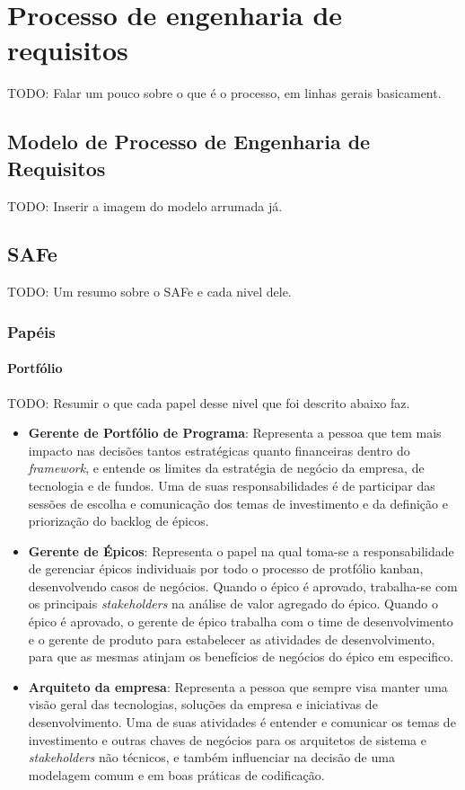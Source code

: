 \chapter{Processo de engenharia de requisitos}

TODO: Falar um pouco sobre o que é o processo, em linhas gerais basicament.

\section{Modelo de Processo de Engenharia de Requisitos}
  
  TODO: Inserir a imagem do modelo arrumada já.

\section{SAFe}
  
  TODO: Um resumo sobre o SAFe e cada nivel dele.

\subsection{Papéis}

\subsubsection{Portfólio}

  TODO: Resumir o que cada papel desse nivel que foi descrito abaixo faz.

  \begin{itemize}
    \item \textbf{Gerente de Portfólio de Programa}: Representa a pessoa que tem mais impacto nas decisões tantos estratégicas quanto financeiras dentro do \textit{framework}, e entende os limites da estratégia de negócio da empresa, de tecnologia e de fundos. Uma de suas responsabilidades é de participar das sessões de escolha e comunicação dos temas de investimento e da definição e priorização do backlog de épicos.
    \item \textbf{Gerente de Épicos}: Representa o papel na qual toma-se a responsabilidade de gerenciar épicos individuais por todo o processo de protfólio kanban, desenvolvendo casos de negócios. Quando o épico é aprovado, trabalha-se com os principais \textit{stakeholders} na análise de valor agregado do épico. Quando o épico é aprovado, o gerente de épico trabalha com o time de desenvolvimento e o gerente de produto para estabelecer as atividades de desenvolvimento, para que as mesmas atinjam os benefícios de negócios do épico em especifico.
    \item \textbf{Arquiteto da empresa}: Representa a pessoa que sempre visa manter uma visão geral das tecnologias, soluções da empresa e iniciativas de desenvolvimento. Uma de suas atividades é entender e comunicar os temas de investimento e outras chaves de negócios para os arquitetos de sistema e \textit{stakeholders} não técnicos, e também influenciar na decisão de uma modelagem comum e em boas práticas de codificação.
  \end{itemize}

